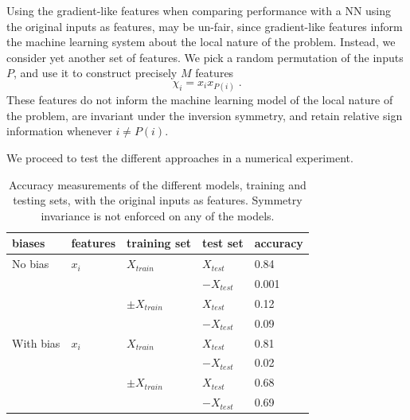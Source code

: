 \documentclass{svproc}
\begin{document}
Using the gradient-like features when comparing performance with a NN using the original inputs as features, may be un-fair, since gradient-like features inform the machine learning system about the local nature of the problem. Instead, we consider yet another set of features. We pick a random permutation of the inputs $P$, and use it to construct precisely $M$ features
\begin{equation}\label{random_features}
\chi_i = x_i x_{P(i)}
\; .
\end{equation}
These features do not inform the machine learning model of the local nature of the problem, are invariant under the inversion symmetry, and retain relative sign information whenever $i \neq P(i)$.

We proceed to test the different approaches in a numerical experiment.

\begin{table}
	\begin{center}
\begin{tabular}{l l l l | l}
	biases & features & training set & test set & accuracy \\ 
	\hline
	No bias & $x_i$ & $X_{train}$ & $X_{test}$ & 0.84 \\
	 &  &  & $-X_{test}$ & 0.001 \\ 
	\cline{3-5}
	 &  & $\pm X_{train}$ & $X_{test}$ & 0.12 \\
	 &  &  & $-X_{test}$ & 0.09 \\ 
	\hline
	\hline
	With bias & $x_i$ & $X_{train}$ & $X_{test}$ & 0.81 \\
	 &  &  & $-X_{test}$ & 0.02 \\ 
	\cline{3-5}
	 &  & $\pm X_{train}$ & $X_{test}$ & 0.68 \\
	 &  &  & $-X_{test}$ & 0.69 \\ 
	\hline
\end{tabular}
\end{center}
\caption{Accuracy measurements of the different models, training and testing sets, with the original inputs as features. Symmetry invariance is not enforced on any of the models.}
\label{table:results_table_no_symmetry}
\end{table}
\end{document}
